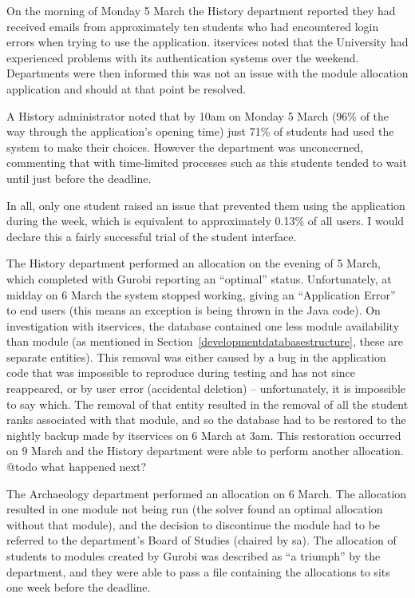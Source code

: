 On the morning of Monday 5 March the History department reported they had
received emails from approximately ten students who had encountered login
errors when trying to use the application. \gls{itservices} noted that the
University had experienced problems with its authentication systems over the
weekend. Departments were then informed this was not an issue with the module
allocation application and should at that point be resolved.

A History administrator noted that by 10am on Monday 5 March (96\% of the way
through the application's opening time) just 71\% of students had used the
system to make their choices. However the department was unconcerned,
commenting that with time-limited processes such as this students tended to
wait until just before the deadline.


In all, only one student raised an issue that prevented them using the
application during the week, which is equivalent to approximately 0.13\% of
all users. I would declare this a fairly successful trial of the student
interface.

The History department performed an allocation on the evening of 5 March,
which completed with Gurobi reporting an ``optimal'' status. Unfortunately, at
midday on 6 March the system stopped working, giving an ``Application Error''
to end users (this means an exception is being thrown in the Java code). On
investigation with \gls{itservices}, the database contained one less module
availability than module (as mentioned in
Section~\ref{developmentdatabasestructure}, these are separate entities). This
removal was either caused by a bug in the application code that was impossible
to reproduce during testing and has not since reappeared, or by user error
(accidental deletion) -- unfortunately, it is impossible to say which. The
removal of that entity resulted in the removal of all the student ranks
associated with that module, and so the database had to be restored to the
nightly backup made by \gls{itservices} on 6 March at 3am. This restoration
occurred on 9 March and the History department were able to perform another
allocation. @todo what happened next?

The Archaeology department performed an allocation on 6 March. The allocation
resulted in one module not being run (the solver found an optimal allocation
without that module), and the decision to discontinue the module had to be
referred to the department's Board of Studies (chaired by \gls{sa}). The
allocation of students to modules created by Gurobi was described as ``a
triumph'' by the department, and they were able to pass a file containing the
allocations to \gls{sits} one week before the deadline.


